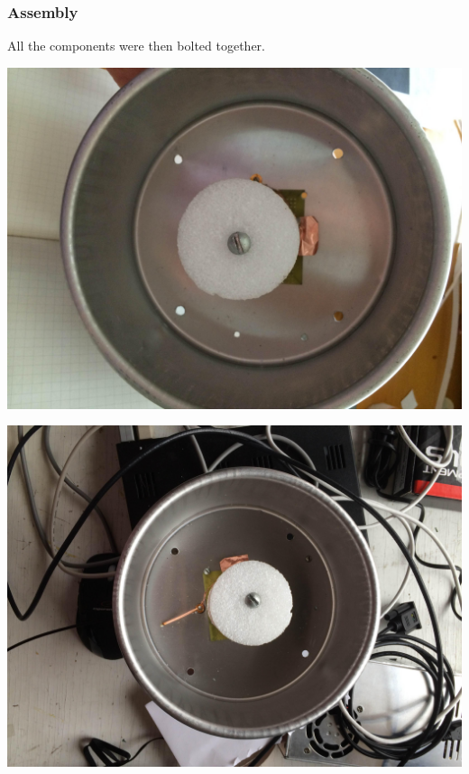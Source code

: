 \documentclass[11pt]{article} %
\begin{document}
\subsubsection{Assembly}
All the components were then bolted together. 

\begin{center}
\includegraphics[scale=0.08]{feed/17.jpeg}
\end{center}

\begin{center}
\includegraphics[scale=0.08]{feed/18.jpeg}
\end{center}
\end{document}
